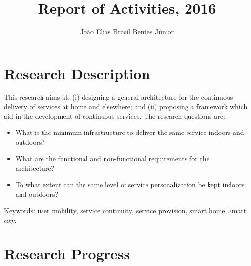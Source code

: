 \documentclass[]{report}
\title{Report of Activities, 2016}
\author{Jo\~{a}o Elias Brasil Bentes J\'{u}nior}
\begin{document}
\maketitle

\section*{Research Description} \label{research-description}

This research aims at: (i) designing a general architecture for the continuous delivery of services at home and elsewhere; and (ii) proposing a framework which aid in the development of continuous services. The research questions are:
\begin{itemize}
	\item What is the minimum infrastructure to deliver the same service indoors and outdoors?
	\item What are the functional and non-functional requirements for the architecture?
	\item To what extent can the same level of service personalization be kept indoors and outdoors?
\end{itemize}
Keywords: user mobility, service continuity, service provision, smart home, smart city.

\section*{Research Progress} 
\end{document}
